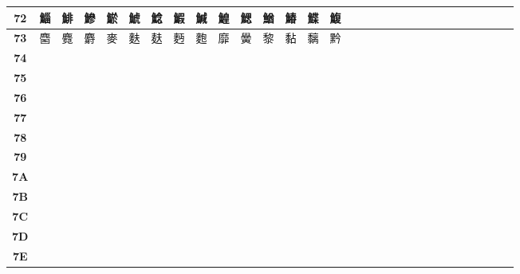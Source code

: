 \begin{table}[H]
\begin{tabular}{|Sc|Sc|Sc|Sc|Sc|Sc|Sc|Sc|Sc|Sc|Sc|Sc|Sc|Sc|Sc|}
\textbf{72} & 鯔 & 鯡 & 鰺 & 鯲 & 鯱 & 鯰 & 鰕 & 鰔 & 鰉 & 鰓 & 鰌 & 鰆 & 鰈 & 鰒 \\ \hline
\textbf{73} & 麕 & 麑 & 麝 & 麥 & 麩 & 麸 & 麪 & 麭 & 靡 & 黌 & 黎 & 黏 & 黐 & 黔 \\ \hline
\textbf{74} &  &  &  &  &  &  &  &  &  &  &  &  &  &  \\ \hline
\textbf{75} &  &  &  &  &  &  &  &  &  &  &  &  &  &  \\ \hline
\textbf{76} &  &  &  &  &  &  &  &  &  &  &  &  &  &  \\ \hline
\textbf{77} &  &  &  &  &  &  &  &  &  &  &  &  &  &  \\ \hline
\textbf{78} &  &  &  &  &  &  &  &  &  &  &  &  &  &  \\ \hline
\textbf{79} &  &  &  &  &  &  &  &  &  &  &  &  &  &  \\ \hline
\textbf{7A} &  &  &  &  &  &  &  &  &  &  &  &  &  &  \\ \hline
\textbf{7B} &  &  &  &  &  &  &  &  &  &  &  &  &  &  \\ \hline
\textbf{7C} &  &  &  &  &  &  &  &  &  &  &  &  &  &  \\ \hline
\textbf{7D} &  &  &  &  &  &  &  &  &  &  &  &  &  &  \\ \hline
\textbf{7E} &  &  &  &  &  &  &  &  &  &  &  &  &  &  \\ \hline
\end{tabular}
\end{table}

